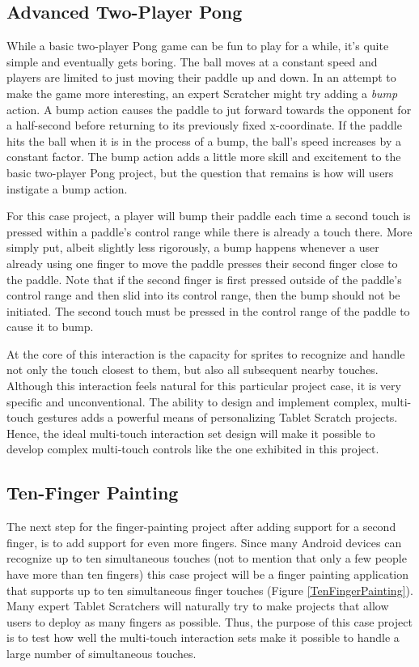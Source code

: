 \subsection{Advanced Two-Player Pong}
While a basic two-player Pong game can be fun to play for a while, it's quite simple and eventually gets boring. The ball moves at a constant speed and players are limited to just moving their paddle up and down. In an attempt to make the game more interesting, an expert Scratcher might try adding a \emph{bump} action. A bump action causes the paddle to jut forward towards the opponent for a half-second before returning to its previously fixed x-coordinate. If the paddle hits the ball when it is in the process of a bump, the ball's speed increases by a constant factor. The bump action adds a little more skill and excitement to the basic two-player Pong project, but the question that remains is how will users instigate a bump action.

For this case project, a player will bump their paddle each time a second touch is pressed within a paddle's control range while there is already a touch there. More simply put, albeit slightly less rigorously, a bump happens whenever a user already using one finger to move the paddle presses their second finger close to the paddle. Note that if the second finger is first pressed outside of the paddle's control range and then slid into its control range, then the bump should not be initiated. The second touch must be pressed in the control range of the paddle to cause it to bump.

At the core of this interaction is the capacity for sprites to recognize and handle not only the touch closest to them, but also all subsequent nearby touches. Although this interaction feels natural for this particular project case, it is very specific and unconventional. The ability to design and implement complex, multi-touch gestures adds a powerful means of personalizing Tablet Scratch projects. Hence, the ideal multi-touch interaction set design will make it possible to develop complex multi-touch controls like the one exhibited in this project.

\subsection{Ten-Finger Painting}
The next step for the finger-painting project after adding support for a second finger, is to add support for even more fingers. Since many Android devices can recognize up to ten simultaneous touches (not to mention that only a few people have more than ten fingers) this case project will be a finger painting application that supports up to ten simultaneous finger touches (Figure \ref{TenFingerPainting}). Many expert Tablet Scratchers will naturally try to make projects that allow users to deploy as many fingers as possible. Thus, the purpose of this case project is to test how well the multi-touch interaction sets make it possible to handle a large number of simultaneous touches. 

